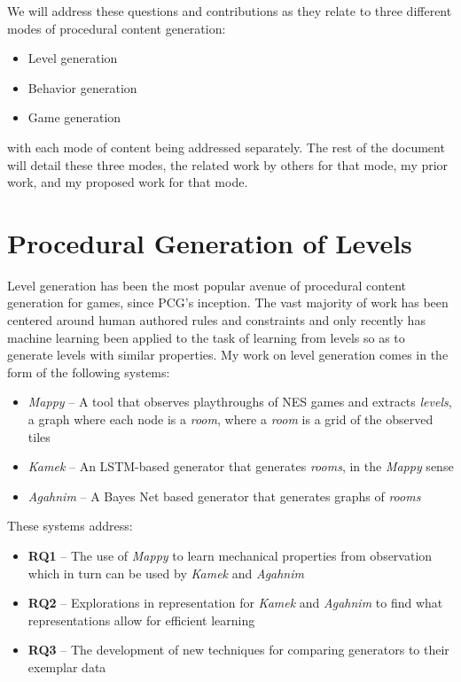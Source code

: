 \documentclass[12pt]{report}
\begin{document}
We will address these questions and contributions as they relate to three different modes of procedural content generation:

\begin{itemize}
\item Level generation
\item Behavior generation
\item Game generation
\end{itemize}

\noindent with each mode of content being addressed separately.  The rest of the document will detail these three modes, the related work by others for that mode, my prior work, and my proposed work for that mode.

\chapter*{Procedural Generation of Levels}

Level generation has been the most popular avenue of procedural content generation for games, since PCG's inception.  The vast majority of work has been centered around human authored rules and constraints and only recently has machine learning been applied to the task of learning from levels so as to generate levels with similar properties.  My work on level generation comes in the form of the following systems:

\begin{itemize}
\item \textit{Mappy} -- A tool that observes playthroughs of NES games and extracts \textit{levels}, a graph where each node is a \textit{room}, where a \textit{room} is a grid of the observed tiles
\item \textit{Kamek} -- An LSTM-based generator that generates \textit{rooms}, in the \textit{Mappy} sense
\item \textit{Agahnim} -- A Bayes Net based generator that generates graphs of \textit{rooms}
\end{itemize}

These systems address:

\begin{itemize}
\item \textbf{RQ1} -- The use of \textit{Mappy} to learn mechanical properties from observation which in turn can be used by \textit{Kamek} and \textit{Agahnim}
\item \textbf{RQ2} -- Explorations in representation for \textit{Kamek} and \textit{Agahnim} to find what representations allow for efficient learning
\item \textbf{RQ3} -- The development of new techniques for comparing generators to their exemplar data 
\end{itemize}
\end{document}

